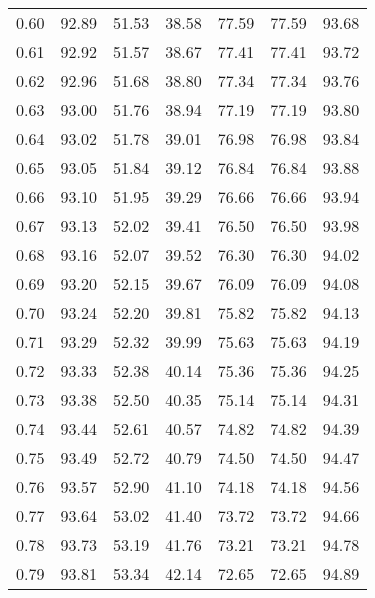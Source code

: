 \begin{tabular}{|c|c|c|c|c|c|c|}
      0.60 &     92.89 &     51.53 &      38.58 &   77.59 &      77.59 &         93.68 \\
      0.61 &     92.92 &     51.57 &      38.67 &   77.41 &      77.41 &         93.72 \\
      0.62 &     92.96 &     51.68 &      38.80 &   77.34 &      77.34 &         93.76 \\
      0.63 &     93.00 &     51.76 &      38.94 &   77.19 &      77.19 &         93.80 \\
      0.64 &     93.02 &     51.78 &      39.01 &   76.98 &      76.98 &         93.84 \\
      0.65 &     93.05 &     51.84 &      39.12 &   76.84 &      76.84 &         93.88 \\
      0.66 &     93.10 &     51.95 &      39.29 &   76.66 &      76.66 &         93.94 \\
      0.67 &     93.13 &     52.02 &      39.41 &   76.50 &      76.50 &         93.98 \\
      0.68 &     93.16 &     52.07 &      39.52 &   76.30 &      76.30 &         94.02 \\
      0.69 &     93.20 &     52.15 &      39.67 &   76.09 &      76.09 &         94.08 \\
      0.70 &     93.24 &     52.20 &      39.81 &   75.82 &      75.82 &         94.13 \\
      0.71 &     93.29 &     52.32 &      39.99 &   75.63 &      75.63 &         94.19 \\
      0.72 &     93.33 &     52.38 &      40.14 &   75.36 &      75.36 &         94.25 \\
      0.73 &     93.38 &     52.50 &      40.35 &   75.14 &      75.14 &         94.31 \\
      0.74 &     93.44 &     52.61 &      40.57 &   74.82 &      74.82 &         94.39 \\
      0.75 &     93.49 &     52.72 &      40.79 &   74.50 &      74.50 &         94.47 \\
      0.76 &     93.57 &     52.90 &      41.10 &   74.18 &      74.18 &         94.56 \\
      0.77 &     93.64 &     53.02 &      41.40 &   73.72 &      73.72 &         94.66 \\
      0.78 &     93.73 &     53.19 &      41.76 &   73.21 &      73.21 &         94.78 \\
      0.79 &     93.81 &     53.34 &      42.14 &   72.65 &      72.65 &         94.89 \\

\end{tabular}
